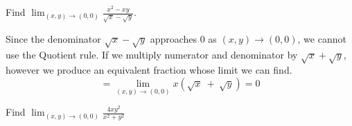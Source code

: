 \documentclass[12pt,a4paper]{article}
\begin{document}
\newpage


\begin{example}
    Find \(\operatorname*{lim}_{(x,y)\to(0,0)}{\frac{x^{2}-x y}{\sqrt{x}-\sqrt{y}}}.\)
\end{example}
\begin{solution}
   Since the denominator \(\sqrt{x} - \sqrt{y}\) approaches 0 as \((x,y) \to (0,0)\), we cannot use the Quotient rule. If we multiply numerator and denominator by \(\sqrt{x} + \sqrt{y}\), however we produce an equivalent fraction whose limit we can find.
   \[=\operatorname*{lim}_{(x,y)\to(0,0)}x\left(\sqrt{x}\:+\:\sqrt{y}\right) = 0\]
\end{solution}


\begin{example}
    Find \(\lim _{(x, y) \rightarrow(0,0)} \frac{4 x y^2}{x^2+y^2}\)
\end{example}
\end{document}
